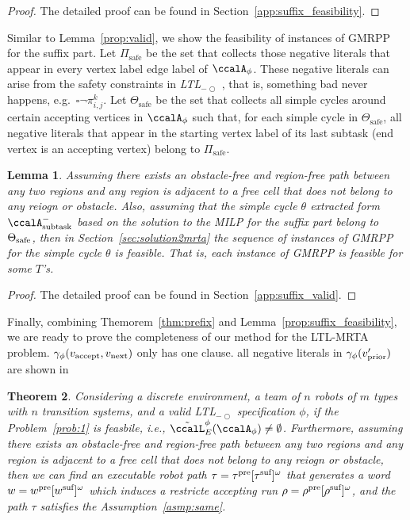 \documentclass[Afour,sageh,times]{sagej}
\makeatletter
\newtheorem{thm}{Theorem}[section]
\newtheorem{lem}[thm]{Lemma}
\newcommand{\ltl}{ {\it LTL}$_{-\bigcirc}$ }
\newcommand{\auto}[1]{\ccalA_{\textup{#1}}}
\newcommand{\autop}{\ccalA_{\phi}}
\newcommand{\vertex}[1]{v_{\textup{#1}}}
\renewcommand{\ap}[3]{\mathcal{\pi}_{{#1},{#2}}^{#3}}
\newcommand{\scriptveryshortarrow}[1][3pt]{{%
    \hbox{\rule[\scriptratio\dimexpr\fontdimen22\textfont2-.2pt\relax]
               {\scriptratio\dimexpr#1\relax}{\scriptratio\dimexpr.4pt\relax}}%
   \mkern-4mu\hbox{\let\f@size\sf@size\usefont{U}{lasy}{m}{n}\symbol{41}}}}
\makeatother
\begin{document}
{{\begin{proof}
  The detailed proof can be found in Section~\ref{app:suffix_feasibility}.
\end{proof}

Similar to Lemma~\ref{prop:valid}, we show the feasibility of instances of GMRPP for the suffix part. Let $\Pi_{\text{safe}}$ be the set that collects those negative literals that appear in every vertex label edge label of $\autop$. These negative literals can arise from the safety constraints in \ltl, that is, something bad never happens, e.g.~$\square \neg \ap{i}{j}{k}$. Let $\Theta_{\text{safe}}$ be the set that collects all simple cycles around certain accepting vertices in $\autop$ such that, for each simple cycle in $\Theta_{\text{safe}}$, all negative literals that appear in the starting vertex label of its last subtask (end vertex is an accepting vertex) belong to $\Pi_{\text{safe}}$.
\begin{lem}\label{prop:suffix_valid}
  Assuming there exists an obstacle-free and region-free path between any two regions and any region is adjacent to a free cell that does not belong to any reiogn or obstacle. Also, assuming that the simple cycle $\theta$ extracted form $\auto{subtask}^-$ based on the solution to the MILP for the suffix part belong to $\Theta_\textup{safe}$,  then in Section~\ref{sec:solution2mrta} the sequence of instances of GMRPP  for the simple cycle $\theta$  is feasible. That is, each instance of GMRPP is feasible for some $T$'s.
\end{lem}

\begin{proof}
  The detailed proof can be found in Section~\ref{app:suffix_valid}.
\end{proof}

Finally, combining Themorem~\ref{thm:prefix} and Lemma~\ref{prop:suffix_feasibility}, we are ready to prove the completeness of our method for the LTL-MRTA problem.
$\gamma_\phi(\vertex{accept},\vertex{next})$ only has one clause. all negative literals in $\gamma_\phi(\vertex{prior}')$ are shown in
\begin{thm}\label{thm:completeness}
  Considering  a discrete environment, a team of $n$ robots of $m$ types with $n$ transition systems, and a valid \ltl specification $\phi$, if the Problem~\ref{prob:1} is feasbile, i.e.,  $\tilde{\ccalL}_E^\phi(\autop) \neq \emptyset$. Furthermore, assuming there exists an obstacle-free and region-free path between any two regions and any region is adjacent to a free cell that does not belong to any reiogn or obstacle, then we can find an executable robot path $\tau=\tau^{\textup{pre}} [\tau^{\textup{suf}}]^\omega$ that  generates a word $w= w^{\textup{pre}} [w^{\textup{suf}}]^\omega$ which induces a restricte accepting run $\rho= \rho^{\textup{pre}} [\rho^{\textup{suf}}]^\omega$, and the path $\tau$ satisfies the Assumption~\ref{asmp:same}.  %
\end{thm}


}}
\end{document}
